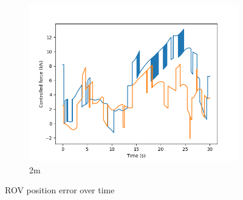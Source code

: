 \documentclass[class=article, crop=false]{standalone}
\begin{document}
\begin{figure}
\begin{subfigure}[b]{0.48\textwidth}
        \includegraphics{scenario1/rov-0m/2.0m/usv_forces}
        \caption{2m}
        \label{}
    \end{subfigure}

    \caption{ROV position error over time}
\end{figure}
\end{document}
